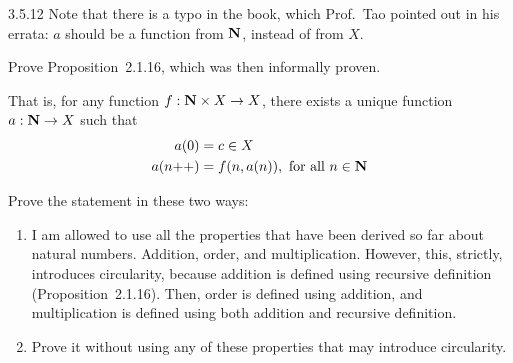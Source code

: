 \begin{exercise}{3.5.12}	
	Note that there is a typo in the book, which Prof.~Tao pointed out in his errata: $a$ should be a function from $\mathbf{N}$, instead of from $X$.
	
	Prove Proposition~2.1.16, which was then informally proven. 
	
	That is, for any function $f: \mathbf{N} \times X \to X$, there exists a unique function $a: \mathbf{N} \to X$ such that
	\begin{align}
		a(0) &= c \in X \label{exer.3.5.12.cond.1}\\
		a(n{+}{+}) &= f(n,a(n)), \hbox{ for all } n \in \mathbf{N} \label{exer.3.5.12.cond.2}
	\end{align}

	Prove the statement in these two ways:
	\begin{enumerate}
		\item I am allowed to use all the properties that have been derived so far about natural numbers. Addition, order, and multiplication. However, this, strictly, introduces circularity, because addition is defined using recursive definition (Proposition~2.1.16). Then, order is defined using addition, and multiplication is defined using both addition and recursive definition.
		
		\item Prove it without using any of these properties that may introduce circularity. 
	\end{enumerate}
\end{exercise}

